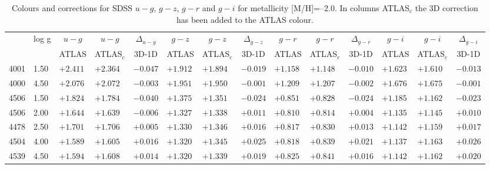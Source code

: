 \documentclass[]{aa}
\def\teff{$T\rm_{eff}$}
\begin{document}
\begin{appendix}
\begin{table*}
\caption{\label{SDSS_1_m20}
Colours and corrections for  SDSS $u-g$, $g-z$, $g-r$ and $g-i$ for metallicity [M/H]=--2.0. In columns ATLAS$_c$ the 3D correction
has been added to the ATLAS colour.  }
\renewcommand{\tabcolsep}{3pt}
\tabskip=0pt
\begin{center}
\begin{tabular}{llllllllllllll}
\hline\noalign{\smallskip}
\multicolumn{1}{c}{\teff} & 
\multicolumn{1}{c}{log g} & 
\multicolumn{1}{c}{$u-g$} &
\multicolumn{1}{c}{$u-g$} &
\multicolumn{1}{c}{$\Delta_{u-g}$} &
\multicolumn{1}{c}{$g-z$} &
\multicolumn{1}{c}{$g-z$} &
\multicolumn{1}{c}{$\Delta_{g-z}$} &
\multicolumn{1}{c}{$g-r$} &
\multicolumn{1}{c}{$g-r$} &
\multicolumn{1}{c}{$\Delta_{g-r}$} & 
\multicolumn{1}{c}{$g-i$} &
\multicolumn{1}{c}{$g-i$} &
\multicolumn{1}{c}{$\Delta_{g-i}$} \\
\multicolumn{2}{c}{ } &  
\multicolumn{1}{c}{ATLAS} &
\multicolumn{1}{c}{ATLAS$_c$}&
\multicolumn{1}{c}{3D-1D}&
\multicolumn{1}{c}{ATLAS} &
\multicolumn{1}{c}{ATLAS$_c$}&
\multicolumn{1}{c}{3D-1D}&
\multicolumn{1}{c}{ATLAS} &
\multicolumn{1}{c}{ATLAS$_c$}&
\multicolumn{1}{c}{3D-1D}&
\multicolumn{1}{c}{ATLAS} &
\multicolumn{1}{c}{ATLAS$_c$}&
\multicolumn{1}{c}{3D-1D} \\
\hline\noalign{\smallskip}
\hline\noalign{\smallskip}
4001  &1.50 & $+2.411$ & $+2.364$ & $-0.047$ & $+1.912$ & $+1.894$ & $-0.019$ & $+1.158$ & $+1.148$ & $-0.010$ & $+1.623 $& $+1.610$ & $-0.013$ \\
4000  &4.50 & $+2.076$ & $+2.072$ & $-0.003$ & $+1.951$ & $+1.950$ & $-0.001$ & $+1.209$ & $+1.207$ & $-0.002$ & $+1.676 $& $+1.675$ & $-0.001$ \\
4506  &1.50 & $+1.824$ & $+1.784$ & $-0.040$ & $+1.375$ & $+1.351$ & $-0.024$ & $+0.851$ & $+0.828$ & $-0.024$ & $+1.185 $& $+1.162$ & $-0.023$ \\
4506  &2.00 & $+1.644$ & $+1.639$ & $-0.006$ & $+1.327$ & $+1.338$ & $+0.011$ & $+0.810$ & $+0.814$ & $+0.004$ & $+1.135 $& $+1.145$ & $+0.010$ \\
4478  &2.50 & $+1.701$ & $+1.706$ & $+0.005$ & $+1.330$ & $+1.346$ & $+0.016$ & $+0.817$ & $+0.830$ & $+0.013$ & $+1.142 $& $+1.159$ & $+0.017$ \\
4504  &4.00 & $+1.589$ & $+1.605$ & $+0.016$ & $+1.320$ & $+1.345$ & $+0.025$ & $+0.818$ & $+0.839$ & $+0.021$ & $+1.137 $& $+1.163$ & $+0.026$ \\
4539  &4.50 & $+1.594$ & $+1.608$ & $+0.014$ & $+1.320$ & $+1.339$ & $+0.019$ & $+0.825$ & $+0.841$ & $+0.016$ & $+1.142 $& $+1.162$ & $+0.020$ \\

\end{tabular}
\end{center}
\end{table*}
\end{appendix}
\end{document}
